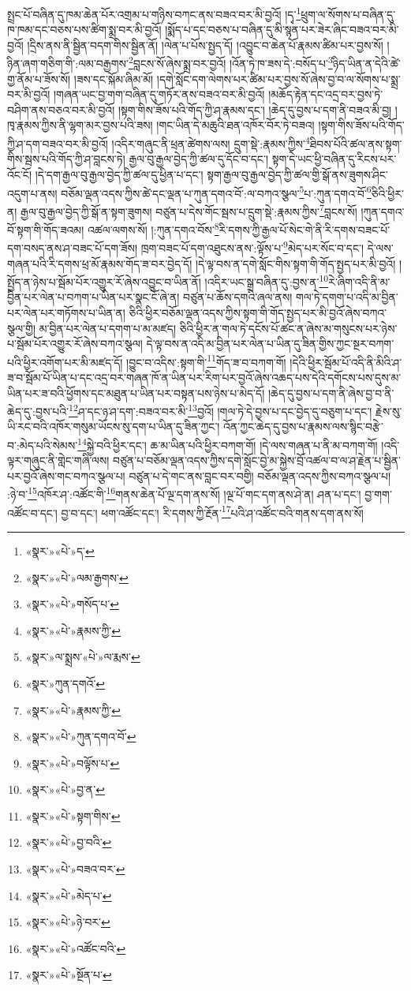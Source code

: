 སྤྲང་པོ་བཞིན་དུ་ཁམ་ཆེན་པོར་འགྲམ་པ་གཉིས་བཀང་ནས་བཟའ་བར་མི་བྱའོ། །དྭ་\footnote{«སྣར་»«པེ་»ད་}ཕྲུག་ལ་སོགས་པ་བཞིན་དུ་ཁ་ཁམ་དང་བཅས་པས་ཚིག་སྨྲ་བར་མི་བྱའོ། །སྨོད་པ་དང་བཅས་པ་བཞིན་དུ་མི་སྙན་པར་ཟེར་ཞིང་བཟའ་བར་མི་བྱའོ། །དྲིས་ནས་ནི་སྦྱིན་བདག་གིས་སྦྱིན་ནོ། །ལེན་པ་པོས་སྤྱད་དོ། །འབྱུང་བ་ཆེན་པོ་རྣམས་ཚིམ་པར་བྱས་སོ། །ཉིན་ཞག་གཅིག་གི་:ལམ་བརྒྱགས་\footnote{«སྣར་»«པེ་»ལམ་རྒྱགས་}བླངས་སོ་ཞེས་སྨྲ་བར་བྱའོ། །འོན་ཏེ་ཁ་ཟས་དེ་:བསོད་པ་\footnote{«སྣར་»«པེ་»གསོད་པ་}ཉིད་ཡིན་ན་དེའི་ཚེ་གྱ་ནོམ་པ་ཟོས་སོ། །ཟས་དང་སྐོམ་ཞིམ་མོ། །དགེ་སློང་དག་ལེགས་པར་ཚིམ་པར་བྱས་སོ་ཞེས་བྱ་བ་ལ་སོགས་པ་སྨྲ་བར་མི་བྱའོ། །གཞན་ཡང་བྱ་གག་བཞིན་དུ་གཏོར་ནས་བཟའ་བར་མི་བྱའོ། །མཆོད་རྟེན་དང་འདྲ་བར་བྱས་ཏེ་བཤིག་ནས་བཅའ་བར་མི་བྱའོ། །སྟག་གིས་ཟོས་པའི་གོད་ཀྱི་ཤ་རྣམས་དང་། །ཆེད་དུ་བྱས་པ་དག་ནི་བཟའ་མི་བྱ། །ཁྭ་རྣམས་ཀྱིས་ནི་ལྷག་མར་བྱས་པའི་ཟས། །གང་ཡིན་དེ་མཆུའི་ཐན་འཁོར་བོར་ཏེ་བཟའ། །སྟག་གིས་ཟོས་པའི་གོད་ཀྱི་ཤ་དག་བཟའ་བར་མི་བྱའོ། །འདིར་གཞུང་ནི་ཕྲན་ཚེགས་ལས། དྲུག་སྡེ་:རྣམས་ཀྱིས་\footnote{«སྣར་»«པེ་»རྣམས་ཀྱི་}ཐིབས་པོའི་ཚལ་ནས་སྟག་གིས་སྦས་པའི་གོད་ཀྱི་ཤ་བླངས་ཏེ། རྒྱལ་བུ་རྒྱལ་བྱེད་ཀྱི་ཚལ་དུ་དོང་བ་དང་། སྟག་དེ་ཡང་ཕྱི་བཞིན་དུ་རིངས་པར་འོང་ངོ། །དེ་དག་རྒྱལ་བུ་རྒྱལ་བྱེད་ཀྱི་ཚལ་དུ་ཕྱིན་པ་དང་། སྟག་རྒྱལ་བུ་རྒྱལ་བྱེད་ཀྱི་ཚལ་གྱི་སྒོ་ནས་ཟུགས་ཤིང་འདུག་པ་ནས། བཅོམ་ལྡན་འདས་ཀྱིས་ཚེ་དང་ལྡན་པ་ཀུན་དགའ་བོ་:ལ་བཀའ་སྩལ་\footnote{«སྣར་»ལ་སྨྲས་«པེ་»ལ་རྨས་}པ་:ཀུན་དགའ་བོ་\footnote{«སྣར་»ཀུན་དགའོ་}ཅིའི་ཕྱིར་ན། རྒྱལ་བུ་རྒྱལ་བྱེད་ཀྱི་སྒོ་ན་སྟག་ཟུགས། བཙུན་པ་དེས་གོང་སྦས་པ་དྲུག་སྡེ་:རྣམས་ཀྱིས་\footnote{«སྣར་»«པེ་»རྣམས་ཀྱི་}བླངས་སོ། །ཀུན་དགའ་བོ་སྟག་གི་གོད་ཟའམ། འཚལ་ལགས་སོ། །:ཀུན་དགའ་བོས་\footnote{«སྣར་»«པེ་»ཀུན་དགའ་བོ་}རི་དགས་ཀྱི་རྒྱལ་པོ་སེང་གེ་ནི་རི་དགས་བཟང་པོ་དག་བསད་ནས་ཤ་བཟང་པོ་དག་ཟོས། ཁྲག་བཟང་པོ་དག་འཐུངས་ནས་:ལྟོས་པ་\footnote{«སྣར་»«པེ་»བལྟོས་པ་}མེད་པར་སོང་བ་དང་། དེ་ལས་གཞན་པའི་རི་དགས་ཕྲ་མོ་རྣམས་གོད་ཟ་བར་བྱེད་དོ། །དེ་ལྟ་བས་ན་དགེ་སློང་གིས་སྟག་གི་གོད་སྤྱད་པར་མི་བྱའོ། །སྤྱོད་ན་ཉེས་པ་སྦོམ་པོར་འགྱུར་རོ་ཞེས་འབྱུང་བ་ཡིན་ནོ། །འདིར་ཡང་སྒྲ་བཞིན་དུ་:བྱས་ན་\footnote{«སྣར་»«པེ་»བྱ་ན་}རེ་ཞིག་འདི་ནི་མ་བྱིན་པར་ལེན་པ་བཀག་པ་ཡིན་པར་སྣང་ངོ་ཞེ་ན། བཙུན་པ་ཆོས་དགའི་ཞལ་ནས། གལ་ཏེ་དགག་པ་འདི་མ་བྱིན་པར་ལེན་པར་གཏོགས་པ་ཡིན་ན། ཅིའི་ཕྱིར་བཅོམ་ལྡན་འདས་ཀྱིས་སྟག་གི་གོད་སྤྱད་པར་མི་བྱའོ་ཞེས་བཀའ་སྩལ་གྱི། མ་བྱིན་པར་ལེན་པ་དགག་པ་མ་མཛད། ཅིའི་ཕྱིར་ན་གལ་ཏེ་དངོས་པོ་ཚང་ན་ཞེས་མ་གསུངས་པར་ཉེས་པ་སྦོམ་པོར་འགྱུར་རོ་ཞེས་བཀའ་སྩལ། དེ་ལྟ་བས་ན་འདི་མ་བྱིན་པར་ལེན་པ་ཡིན་དུ་ཟིན་གྱིས་ཀྱང་སྔར་བཀག་པའི་ཕྱིར་འགོག་པར་མི་མཛད་དོ། །བྱུང་བ་འདིས་:སྟག་གི་\footnote{«སྣར་»«པེ་»སྟག་གིས་}གོད་ཟ་བ་བཀག་གོ། །དེའི་ཕྱིར་སྦོམ་པོ་འདི་ནི་མིའི་ཤ་ཟ་བ་སྦོམ་པོ་ཡིན་པ་དང་འདྲ་བར་གཞན་ཁོ་ན་ཡིན་པར་རིག་པར་བྱའོ་ཞེས་འཆད་པས་དེའི་དགོངས་པས་དུས་མ་ཡིན་པར་ཟ་བའི་ཕྱོགས་དང་མཐུན་པ་ཡིན་པར་བསྟན་པས་ཉེས་པ་མེད་དོ། །ཆེད་དུ་བྱས་པ་དག་ནི་ཞེས་བྱ་བ་ནི་ཆེད་དུ་:བྱས་པའི་\footnote{«སྣར་»«པེ་»བྱ་བའི་}ཤ་དང་ཉ་ཤ་དག་:བཟའ་བར་མི་\footnote{«སྣར་»«པེ་»བཟའ་བར་}བྱའོ། །གལ་ཏེ་དེ་བྱས་པ་དང་བྱེད་དུ་བཅུག་པ་དང་། རྗེས་སུ་ཡི་རང་བའི་འཁོར་གསུམ་ཡོངས་སུ་དག་པ་ཡིན་དུ་ཟིན་ཀྱང་། འོན་ཀྱང་ཆེད་དུ་བྱས་པ་རྣམས་ལས་སྙིང་བརྩེ་བ་:མེད་པའི་སེམས་\footnote{«སྣར་»«པེ་»མེད་པ་}སྐྱེ་བའི་ཕྱིར་དང་། ཆ་མ་ཡིན་པའི་ཕྱིར་བཀག་གོ། །དེ་ལས་གཞན་པ་ནི་མ་བཀག་གོ། །འདི་ལྟར་གཞུང་ནི་གླེང་གཞི་ལས། བཙུན་པ་བཅོམ་ལྡན་འདས་ཀྱིས་དགེ་སློང་བྱེ་མ་སྐྱེས་བྲོ་འཚལ་བ་ལ་ཤ་རྗེན་པ་སྦྱིན་པར་བྱའོ་ཞེས་གང་བཀའ་སྩལ་པ། བཙུན་པ་དེ་གང་ནས་བླང་བར་བགྱི། བཅོམ་ལྡན་འདས་ཀྱིས་བཀའ་སྩལ་པ། :ཉེ་བ་\footnote{«སྣར་»«པེ་»ཉེ་བར་}འཁོར་ཤ་:འཚོང་གི་\footnote{«སྣར་»«པེ་»འཚོང་བའི་}གནས་ཆེན་པོ་ལྔ་དག་ནས་སོ། །ལྔ་པོ་གང་དག་ནས་ཤེ་ན། ཤན་པ་དང་། བྱ་གག་འཚོང་བ་དང་། བྱ་བ་དང་། ཕག་འཚོང་དང་། རི་དགས་ཀྱི་རྔོན་\footnote{«སྣར་»«པེ་»སྔོན་པ་}པའི་ཤ་འཚོང་བའི་གནས་དག་ནས་སོ། 